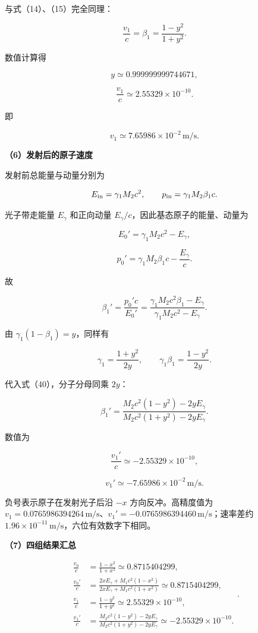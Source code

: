 \documentclass[12pt,a4paper,UTF8]{ctexart}
\begin{document}
与式（14）、（15）完全同理：

\[
\boxed{
\frac{v_1}{c}=\beta_1=\frac{1-y^2}{1+y^2}
}.
\tag{35}
\]

数值计算得

\[
y\simeq0.999999999744671,
\]

\[
\boxed{
\frac{v_1}{c}
\simeq2.55329\times10^{-10}
}.
\tag{36}
\]

即

\[
\boxed{
v_1\simeq7.65986\times10^{-2}\,\mathrm{m/s}
}.
\tag{37}
\]

\textbf{（6）发射后的原子速度}

发射前总能量与动量分别为

\[
E_{\rm in}=\gamma_1M_2c^2,
\qquad
p_{\rm in}=\gamma_1M_2\beta_1c.
\]

光子带走能量 \(E_\gamma\) 和正向动量
\(E_\gamma/c\)，因此基态原子的能量、动量为

\[
E_0'=\gamma_1M_2c^2-E_\gamma,
\tag{38}
\]

\[
p_0'=\gamma_1M_2\beta_1c-\frac{E_\gamma}{c}.
\tag{39}
\]

故

\[
\boxed{
\beta_1'
=\frac{p_0'c}{E_0'}
=\frac{\gamma_1M_2c^2\beta_1-E_\gamma}
{\gamma_1M_2c^2-E_\gamma}
}.
\tag{40}
\]

由 \(\gamma_1(1-\beta_1)=y\)，同样有

\[
\gamma_1=\frac{1+y^2}{2y},
\qquad
\gamma_1\beta_1=\frac{1-y^2}{2y}.
\tag{41}
\]

代入式（40），分子分母同乘 \(2y\)：

\[
\boxed{
\beta_1'
=\frac{M_2c^2(1-y^2)-2yE_\gamma}
{M_2c^2(1+y^2)-2yE_\gamma}
}.
\tag{42}
\]

数值为

\[
\boxed{
\frac{v_1'}c
\simeq-2.55329\times10^{-10}
},
\tag{43}
\]

\[
\boxed{
v_1'\simeq-7.65986\times10^{-2}\,\mathrm{m/s}
}.
\tag{44}
\]

负号表示原子在发射光子后沿 \(-x\) 方向反冲。高精度值为
\(v_1=0.0765986394264\,\mathrm{m/s}\)、\(v_1'= -0.0765986394460\,\mathrm{m/s}\)；速率差约
\(1.96\times10^{-11}\,\mathrm{m/s}\)，六位有效数字下相同。

\textbf{（7）四组结果汇总}

\[
\boxed{
\begin{aligned}
\frac{v_0}{c}&=\frac{1-x^2}{1+x^2}
\simeq0.8715404299,\\
\frac{v_0'}{c}
&=\frac{2xE_\gamma+M_1c^2(1-x^2)}
{2xE_\gamma+M_1c^2(1+x^2)}
\simeq0.8715404299,\\
\frac{v_1}{c}&=\frac{1-y^2}{1+y^2}
\simeq2.55329\times10^{-10},\\
\frac{v_1'}{c}
&=\frac{M_2c^2(1-y^2)-2yE_\gamma}
{M_2c^2(1+y^2)-2yE_\gamma}
\simeq-2.55329\times10^{-10}.
\end{aligned}
}.
\tag{45}
\]
\end{document}
